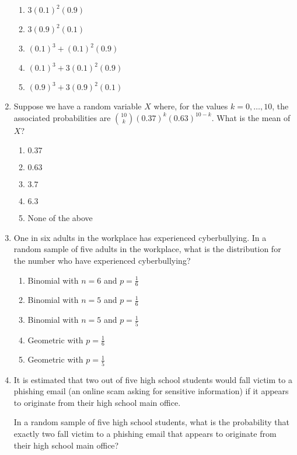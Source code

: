 \documentclass{article}
\begin{document}
\begin{enumerate}[label=\textbf{S\arabic*.}]
\begin{enumerate}
  \item $3(0.1)^2(0.9)$
  \item $3(0.9)^2(0.1)$
  \item $(0.1)^3 + (0.1)^2(0.9)$
  \item $(0.1)^3 + 3(0.1)^2(0.9)$
  \item $(0.9)^3 + 3(0.9)^2(0.1)$
\end{enumerate}

\item Suppose we have a random variable $X$ where, for the values $k=0,\dots,10$, the associated probabilities are $\binom{10}{k}(0.37)^k(0.63)^{10-k}$. What is the mean of $X$? 

\begin{enumerate}
  \item $0.37$
  \item $0.63$
  \item $3.7$
  \item $6.3$
  \item None of the above
\end{enumerate}

\item One in six adults in the workplace has experienced cyberbullying. In a random sample of five adults in the workplace, what is the distribution for the number who have experienced cyberbullying? 

\begin{enumerate}
  \item Binomial with $n=6$ and $p=\tfrac{1}{6}$
  \item Binomial with $n=5$ and $p=\tfrac{1}{6}$
  \item Binomial with $n=5$ and $p=\tfrac{1}{5}$
  \item Geometric with $p=\tfrac{1}{6}$
  \item Geometric with $p=\tfrac{1}{5}$
\end{enumerate}

\item It is estimated that two out of five high school students would fall victim to a phishing email (an online scam asking for sensitive information) if it appears to originate from their high school main office.

In a random sample of five high school students, what is the probability that exactly two fall victim to a phishing email that appears to originate from their high school main office? 


\end{enumerate}
\end{document}
